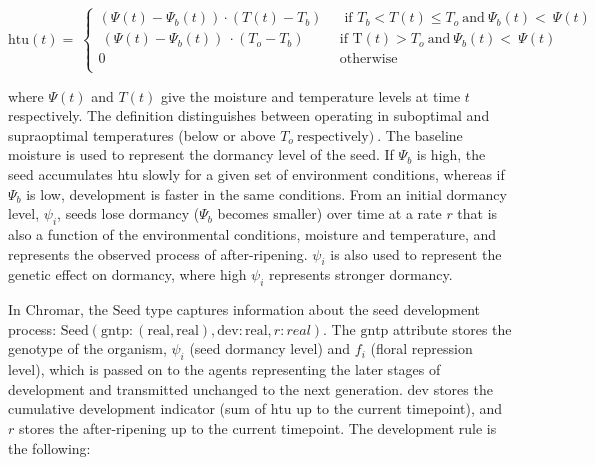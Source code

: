 \documentclass[phd]{infthesis}
\begin{document}
\[\text{htu}\left( t \right) = \ \left\{ \begin{matrix}
\left( \Psi\left( t \right) - \Psi_{b}\left( t \right) \right) \cdot \left( T\left( t \right) - T_{b} \right) \\
\ \left( \Psi\left( t \right) - \Psi_{b}\left( t \right) \right)\  \cdot \left( T_{o} - T_{b} \right) \\
0 \\
\end{matrix} \right.\ \ \begin{matrix}
\text{\ \ if\ \ }T_{b} < T\left( t \right) \leq T_{o}\ \text{and}\ \Psi_{b}\left( t \right) < \ \Psi(t) \\
\text{if\ \ T}\left( t \right) > T_{o}\ \text{and}\ \Psi_{b}\left( t \right) < \ \Psi\left( t \right) \\
\text{otherwise} \\
\end{matrix}\]

where \(\Psi(t)\) and \(T(t)\) give the moisture and temperature levels
at time \(t\) respectively. The definition distinguishes between
operating in suboptimal and supraoptimal temperatures (below or above
\(T_{o}\ \text{respectively})\ \). The baseline moisture is used to
represent the dormancy level of the seed. If \(\Psi_{b}\) is high, the
seed accumulates htu slowly for a given set of environment conditions,
whereas if \(\Psi_{b}\) is low, development is faster in the same
conditions. From an initial dormancy level, \(\psi_{i}\), seeds lose
dormancy (\(\Psi_{b}\) becomes smaller) over time at a rate $r$
that is also a function of the environmental conditions, moisture and
temperature, and represents the observed process of after-ripening.
\(\psi_{i}\) is also used to represent the genetic effect on dormancy,
where high \(\psi_{i}\) represents stronger dormancy.

In Chromar, the \(\text{Seed}\) type captures information about the seed
development process:
\(\text{Seed}(\text{gntp}:(\text{real},\text{real}),\text{dev}:\text{real},r:real)\).
The \(\text{gntp}\) attribute stores the genotype of the organism,
\(\psi_{i}\) (seed dormancy level) and \(f_{i}\) (floral repression
level), which is passed on to the agents representing the later stages
of development and transmitted unchanged to the next generation.
\(\text{dev}\) stores the cumulative development indicator (sum of
\(\text{htu}\) up to the current timepoint), and \(r\) stores the
after-ripening up to the current timepoint. The development rule is the
following:
\end{document}

